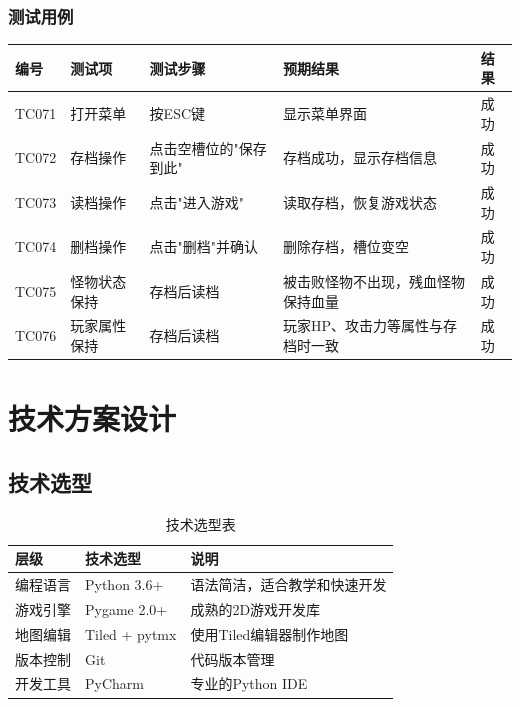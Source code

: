 \documentclass[a4paper,12pt]{article}
\begin{document}
\subsubsection{测试用例}
\begin{longtable}{p{1.2cm} p{2.8cm} p{4cm} p{3.5cm} p{1.5cm}}
\toprule
\textbf{编号} & \textbf{测试项} & \textbf{测试步骤} & \textbf{预期结果} & \textbf{结果} \\
\midrule
\endhead
TC071 & 打开菜单 & 按ESC键 & 显示菜单界面 & 成功 \\
TC072 & 存档操作 & 点击空槽位的"保存到此" & 存档成功，显示存档信息 & 成功 \\
TC073 & 读档操作 & 点击"进入游戏" & 读取存档，恢复游戏状态 & 成功 \\
TC074 & 删档操作 & 点击"删档"并确认 & 删除存档，槽位变空 & 成功 \\
TC075 & 怪物状态保持 & 存档后读档 & 被击败怪物不出现，残血怪物保持血量 & 成功 \\
TC076 & 玩家属性保持 & 存档后读档 & 玩家HP、攻击力等属性与存档时一致 & 成功 \\
\bottomrule
\end{longtable}

\section{技术方案设计}

\subsection{技术选型}

\begin{table}[htbp]
\centering
\caption{技术选型表}
\begin{tabular}{lll}
\toprule
\textbf{层级} & \textbf{技术选型} & \textbf{说明} \\
\midrule
编程语言 & Python 3.6+ & 语法简洁，适合教学和快速开发 \\
游戏引擎 & Pygame 2.0+ & 成熟的2D游戏开发库 \\
地图编辑 & Tiled + pytmx & 使用Tiled编辑器制作地图 \\
版本控制 & Git & 代码版本管理 \\
开发工具 & PyCharm & 专业的Python IDE \\
\bottomrule
\end{tabular}
\end{table}
\end{document}
